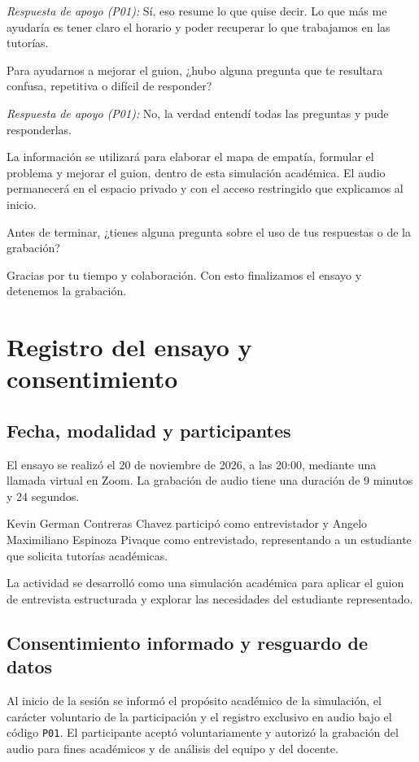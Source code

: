 \documentclass[11pt,a4paper]{article}
\begin{document}
\textit{Respuesta de apoyo (P01):} Sí, eso resume lo que quise decir. Lo que más me ayudaría es tener claro el horario y poder recuperar lo que trabajamos en las tutorías.

Para ayudarnos a mejorar el guion, ¿hubo alguna pregunta
que te resultara confusa, repetitiva o difícil de responder?

\textit{Respuesta de apoyo (P01):} No, la verdad entendí todas las preguntas y pude responderlas.

La información se utilizará para elaborar el mapa de empatía,
formular el problema y mejorar el guion, dentro de esta
simulación académica. El audio permanecerá en el espacio
privado y con el acceso restringido que explicamos al inicio.

Antes de terminar, ¿tienes alguna pregunta sobre el uso
de tus respuestas o de la grabación?

Gracias por tu tiempo y colaboración. Con esto finalizamos
el ensayo y detenemos la grabación.

\section{Registro del ensayo y consentimiento}

\subsection{Fecha, modalidad y participantes}

El ensayo se realizó el 20 de noviembre de 2026,
a las 20:00, mediante una llamada virtual en Zoom.
La grabación de audio tiene una duración de
9 minutos y 24 segundos.

Kevin German Contreras Chavez participó como
entrevistador y Angelo Maximiliano Espinoza Pivaque
como entrevistado, representando a un estudiante
que solicita tutorías académicas.

La actividad se desarrolló como una simulación
académica para aplicar el guion de entrevista
estructurada y explorar las necesidades del
estudiante representado.

\subsection{Consentimiento informado y resguardo de datos}

Al inicio de la sesión se informó el propósito académico de la simulación, el carácter voluntario de la participación y el registro exclusivo en audio bajo el código \texttt{P01}. El participante aceptó voluntariamente y autorizó la grabación del audio para fines académicos y de análisis del equipo y del docente.
\end{document}
